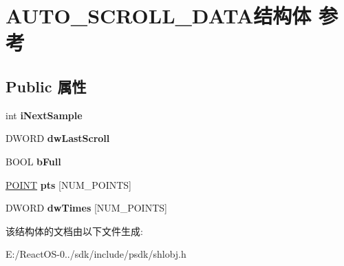 \hypertarget{struct_a_u_t_o___s_c_r_o_l_l___d_a_t_a}{}\section{A\+U\+T\+O\+\_\+\+S\+C\+R\+O\+L\+L\+\_\+\+D\+A\+T\+A结构体 参考}
\label{struct_a_u_t_o___s_c_r_o_l_l___d_a_t_a}
\subsection*{Public 属性}
\begin{DoxyCompactItemize}
\item 
\mbox{\label{struct_a_u_t_o___s_c_r_o_l_l___d_a_t_a_a67972a0a84868c7964c2fb935ef54bfd}} 
int {\bfseries i\+Next\+Sample}
\item 
\mbox{\label{struct_a_u_t_o___s_c_r_o_l_l___d_a_t_a_aea94c865105835f405cfc6d7546c2ea8}} 
D\+W\+O\+RD {\bfseries dw\+Last\+Scroll}
\item 
\mbox{\label{struct_a_u_t_o___s_c_r_o_l_l___d_a_t_a_ad4e7ea6320bd31b9565ea82bb18cba76}} 
B\+O\+OL {\bfseries b\+Full}
\item 
\mbox{\label{struct_a_u_t_o___s_c_r_o_l_l___d_a_t_a_a2b41dbab9d2c27438e5867f88b55eb0b}} 
\hyperlink{structtag_p_o_i_n_t}{P\+O\+I\+NT} {\bfseries pts} \mbox{[}N\+U\+M\+\_\+\+P\+O\+I\+N\+TS\mbox{]}
\item 
\mbox{\label{struct_a_u_t_o___s_c_r_o_l_l___d_a_t_a_a4bd3f46047a050d9cf850e526791859f}} 
D\+W\+O\+RD {\bfseries dw\+Times} \mbox{[}N\+U\+M\+\_\+\+P\+O\+I\+N\+TS\mbox{]}
\end{DoxyCompactItemize}


该结构体的文档由以下文件生成\+:\begin{DoxyCompactItemize}
\item 
E\+:/\+React\+O\+S-\/0../sdk/include/psdk/shlobj.\+h\end{DoxyCompactItemize}
